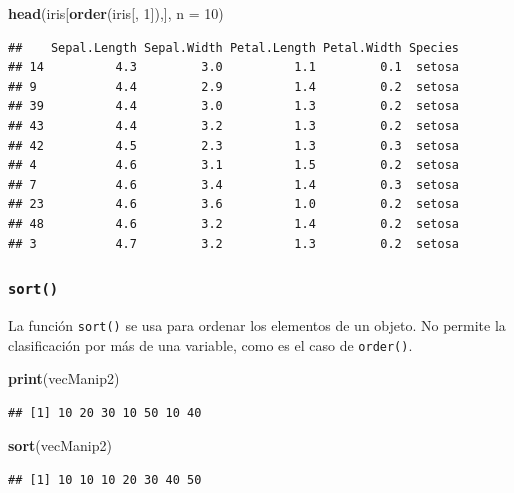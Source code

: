 \documentclass[]{book}
\newenvironment{Shaded}{\begin{snugshade}}{\end{snugshade}}
\newcommand{\KeywordTok}[1]{\textcolor[rgb]{0.13,0.29,0.53}{\textbf{#1}}}
\newcommand{\DataTypeTok}[1]{\textcolor[rgb]{0.13,0.29,0.53}{#1}}
\newcommand{\DecValTok}[1]{\textcolor[rgb]{0.00,0.00,0.81}{#1}}
\newcommand{\NormalTok}[1]{#1}
\begin{document}
\begin{Shaded}
\begin{Highlighting}[]
\KeywordTok{head}\NormalTok{(iris[}\KeywordTok{order}\NormalTok{(iris[, }\DecValTok{1}\NormalTok{]),], }\DataTypeTok{n =} \DecValTok{10}\NormalTok{)}
\end{Highlighting}
\end{Shaded}

\begin{verbatim}
##    Sepal.Length Sepal.Width Petal.Length Petal.Width Species
## 14          4.3         3.0          1.1         0.1  setosa
## 9           4.4         2.9          1.4         0.2  setosa
## 39          4.4         3.0          1.3         0.2  setosa
## 43          4.4         3.2          1.3         0.2  setosa
## 42          4.5         2.3          1.3         0.3  setosa
## 4           4.6         3.1          1.5         0.2  setosa
## 7           4.6         3.4          1.4         0.3  setosa
## 23          4.6         3.6          1.0         0.2  setosa
## 48          4.6         3.2          1.4         0.2  setosa
## 3           4.7         3.2          1.3         0.2  setosa
\end{verbatim}

\subsubsection{\texorpdfstring{\texttt{sort()}}{sort()}}\label{l015sort}

La función \texttt{sort()} se usa para ordenar los elementos de un
objeto. No permite la clasificación por más de una variable, como es el
caso de \texttt{order()}.

\begin{Shaded}
\begin{Highlighting}[]
\KeywordTok{print}\NormalTok{(vecManip2)}
\end{Highlighting}
\end{Shaded}

\begin{verbatim}
## [1] 10 20 30 10 50 10 40
\end{verbatim}

\begin{Shaded}
\begin{Highlighting}[]
\KeywordTok{sort}\NormalTok{(vecManip2)}
\end{Highlighting}
\end{Shaded}

\begin{verbatim}
## [1] 10 10 10 20 30 40 50
\end{verbatim}
\end{document}
